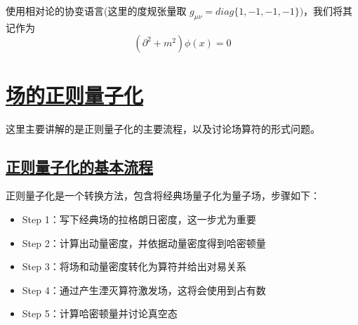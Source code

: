 使用相对论的协变语言(这里的度规张量取 $g_{\mu\nu} = diag\{1,-1,-1,-1\})$，我们将其记作为
\begin{equation*}
    \left(\partial^2 + m^2\right)\phi(x) = 0
\end{equation*}

\section{\protect\hyperlink{:}{场的正则量子化}}

这里主要讲解的是正则量子化的主要流程，以及讨论场算符的形式问题。


\subsection{\protect\hyperlink{:}{正则量子化的基本流程}}

正则量子化是一个转换方法，包含将经典场量子化为量子场，步骤如下：
\begin{itemize}
    \item Step 1：写下经典场的拉格朗日密度，这一步尤为重要
    \item Step 2：计算出动量密度，并依据动量密度得到哈密顿量
    \item Step 3：将场和动量密度转化为算符并给出对易关系
    \item Step 4：通过产生湮灭算符激发场，这将会使用到占有数
    \item Step 5：计算哈密顿量并讨论真空态
\end{itemize}



